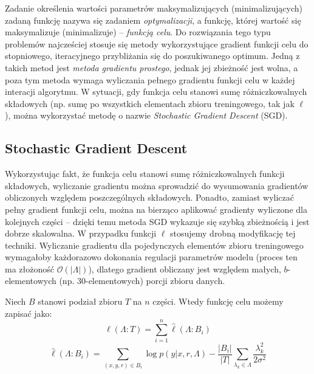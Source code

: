 \documentclass[a4paper,10]{article}
\begin{document}
Zadanie określenia wartości parametrów maksymalizujących (minimalizujących) zadaną
funkcję nazywa się zadaniem \emph{optymalizacji}, a funkcję,
której wartość się maksymalizuje (minimalizuje) -- \emph{funkcją celu}.
Do rozwiązania tego typu problemów najcześciej stosuje się
metody wykorzystujące gradient funkcji celu do stopniowego,
iteracyjnego przybliżania się do poszukiwanego optimum.
Jedną z takich metod jest \emph{metoda gradientu prostego}, jednak
jej zbieżność jest wolna, a poza tym metoda wymaga wyliczania
pełnego gradientu funkcji celu w każdej interacji algorytmu.
W sytuacji, gdy funkcja celu stanowi sumę różniczkowalnych
składowych (np. sumę po wszystkich elementach zbioru treningowego,
tak jak $\ell$), można wykorzystać metodę
o nazwie \emph{Stochastic Gradient Descent} (SGD).%

\subsection{Stochastic Gradient Descent}\label{sec:sgd}

Wykorzystując fakt, że funkcja celu stanowi sumę różniczkowalnych
funkcji składowych, wyliczanie gradientu można sprowadzić do wysumowania
gradientów obliczonych względem poszczególnych składowych.
Ponadto, zamiast wyliczać pełny gradient funkcji celu, można na bierząco
aplikować gradienty wyliczone dla kolejnych części -- dzięki temu
metoda SGD wykazuje się szybką zbieżnością i jest dobrze skalowalna.
W przypadku funkcji $\ell$ stosujemy drobną modyfikację tej techniki.
Wyliczanie gradientu dla pojedynczych elementów zbioru treningowego
wymagałoby każdorazowo dokonania regulacji parametrów modelu
(proces ten ma złożoność $\mathcal O(|\Lambda|)$),
dlatego gradient obliczany jest względem małych, $b$-elementowych
(np. 30-elementowych) porcji zbioru danych.

Niech $B$ stanowi podział zbioru $T$ na $n$ części. Wtedy funkcję celu
możemy zapisać jako:
\begin{equation}
\ell(\Lambda : T) = \sum_{i=1}^n \hat \ell(\Lambda : B_i)
\end{equation}
\begin{equation}
\hat \ell(\Lambda : B_i) = \sum_{(x, y, r) \in B_i}
\log p(y \vert x, r, \Lambda) - \frac{|B_i|}{|T|}
\sum_{\lambda_k \in \Lambda} \frac{\lambda_k^2}{2\sigma^2}
\end{equation}
\end{document}
